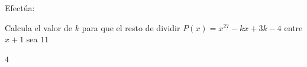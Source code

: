 \documentclass[addpoints,spanish, 12pt,a4paper]{exam}
\begin{document}
\begin{questions}
        \question[2] Efectúa:
        \begin{multicols}{2} 
        \end{multicols}
        \question[2] Calcula el valor de $k$ para que el resto de dividir
   $P(x)=x^{27}-kx+3k-4$  entre  $x+1$  sea $11$    \begin{solution}  $ 4 $  \end{solution}
        
    \end{questions}
    
\end{document}
